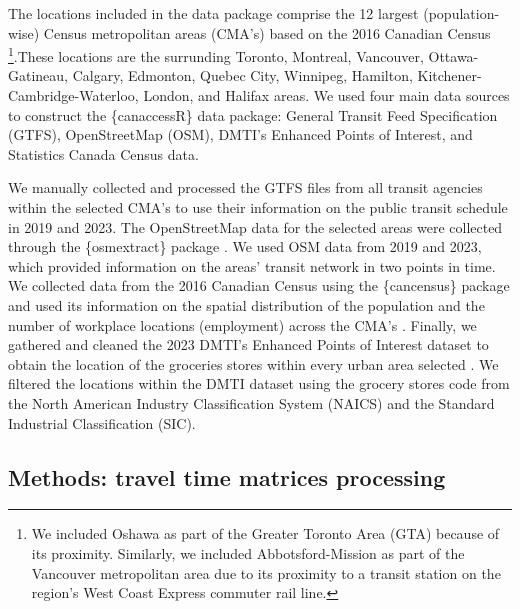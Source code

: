 \documentclass[Royal,times,sageh]{sagej}
\begin{document}
The locations included in the data package comprise the 12 largest
(population-wise) Census metropolitan areas (CMA's) based on the 2016
Canadian Census \citep{governmentofcanada2016CensusPopulation2016}
\footnote{We included Oshawa as part of the Greater Toronto Area (GTA)
  because of its proximity. Similarly, we included Abbotsford-Mission as
  part of the Vancouver metropolitan area due to its proximity to a
  transit station on the region's West Coast Express commuter rail line.}.These
locations are the surrunding Toronto, Montreal, Vancouver,
Ottawa-Gatineau, Calgary, Edmonton, Quebec City, Winnipeg, Hamilton,
Kitchener-Cambridge-Waterloo, London, and Halifax areas. We used four
main data sources to construct the \{canaccessR\} data package: General
Transit Feed Specification (GTFS), OpenStreetMap (OSM), DMTI's Enhanced
Points of Interest, and Statistics Canada Census data.

We manually collected and processed the GTFS files from all transit
agencies within the selected CMA's to use their information on the
public transit schedule in 2019 and 2023. The OpenStreetMap data for the
selected areas were collected through the \{osmextract\} package
\citep{gilardiOsmextractDownloadImport2025}. We used OSM data from 2019
and 2023, which provided information on the areas' transit network in
two points in time. We collected data from the 2016 Canadian Census
using the \{cancensus\} package
\citep{vonbergmannCancensusPackageAccess2022} and used its information
on the spatial distribution of the population and the number of
workplace locations (employment) across the CMA's
\citep{governmentofcanada2016CensusPopulation2016}. Finally, we gathered
and cleaned the 2023 DMTI's Enhanced Points of Interest dataset to
obtain the location of the groceries stores within every urban area
selected \citep{dmtispatialincEnhancedPointsInterest2015}. We filtered
the locations within the DMTI dataset using the grocery stores code from
the North American Industry Classification System (NAICS) and the
Standard Industrial Classification (SIC).

\subsection{Methods: travel time matrices
processing}\label{methods-travel-time-matrices-processing}
\end{document}

